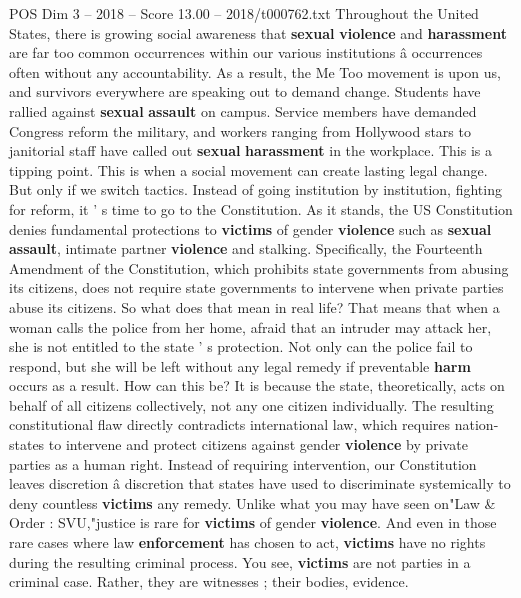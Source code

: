 \begin{textsample}{POS Dim 3 – 2018 – Score 13.00 – 2018/t000762.txt}  \label{ex:f3_pos_019}
Throughout the United States, there is growing social awareness that \textbf{sexual} \textbf{violence} and \textbf{harassment} are far too common occurrences within our various institutions â occurrences often without any accountability.
As a result, the Me Too movement is upon us, and survivors everywhere are speaking out to demand change.
Students have rallied against \textbf{sexual} \textbf{assault} on campus.
Service members have demanded Congress reform the military, and workers ranging from Hollywood stars to janitorial staff have called out \textbf{sexual} \textbf{harassment} in the workplace.
This is a tipping point.
This is when a social movement can create lasting legal change.
But only if we switch tactics.
Instead of going institution by institution, fighting for reform, it ' s time to go to the Constitution.
As it stands, the US Constitution denies fundamental protections to \textbf{victims} of gender \textbf{violence} such as \textbf{sexual} \textbf{assault}, intimate partner \textbf{violence} and stalking.
Specifically, the Fourteenth Amendment of the Constitution, which prohibits state governments from abusing its citizens, does not require state governments to intervene when private parties abuse its citizens.
So what does that mean in real life?
That means that when a woman calls the police from her home, afraid that an intruder may attack her, she is not entitled to the state ' s protection.
Not only can the police fail to respond, but she will be left without any legal remedy if preventable \textbf{harm} occurs as a result.
How can this be?
It is because the state, theoretically, acts on behalf of all citizens collectively, not any one citizen individually.
The resulting constitutional flaw directly contradicts international law, which requires nation-states to intervene and protect citizens against gender \textbf{violence} by private parties as a human right.
Instead of requiring intervention, our Constitution leaves discretion â discretion that states have used to discriminate systemically to deny countless \textbf{victims} any remedy.
Unlike what you may have seen on"Law \& Order : SVU,"justice is rare for \textbf{victims} of gender \textbf{violence}.
And even in those rare cases where law \textbf{enforcement} has chosen to act, \textbf{victims} have no rights during the resulting criminal process.
You see, \textbf{victims} are not parties in a criminal case.
Rather, they are witnesses ; their bodies, evidence.

\end{textsample}

